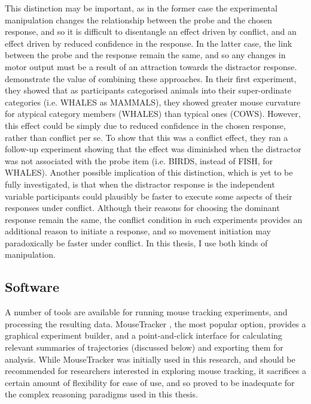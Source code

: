 This distinction may be important, as in the former case
the experimental manipulation changes the relationship between
the probe and the chosen response,
and so it is difficult to disentangle an effect driven by conflict,
and an effect driven by reduced confidence in the response.
In the latter case, the link between the probe and the response remain the same,
and so any changes in motor output
must be a result of an attraction towards the distractor response.
\citet{Dale2007} demonstrate the value of combining these approaches.
In their first experiment, they showed that
as participants categorised animals into their super-ordinate categories (i.e. WHALES as MAMMALS),
they showed greater mouse curvature for atypical category members (WHALES)
than typical ones (COWS).
However, this effect could be simply due to
reduced confidence in the chosen response, rather than conflict per se.
To show that this was a conflict effect,
they ran  a follow-up experiment showing that the effect was diminished
when the distractor was not associated with the probe item
(i.e. BIRDS, instead of FISH, for WHALES).
Another possible implication of this distinction,
which is yet to be fully investigated,
is that when the distractor response is the independent variable
participants could plausibly be faster to execute some aspects of their responses under conflict.
Although their reasons for choosing the dominant response remain the same,
the conflict condition in such experiments provides
an additional reason to initiate a response,
and so movement initiation may paradoxically be faster under conflict.
In this thesis, I use both kinds of manipulation.


\subsection{Software}\label{sec:mousetracking-software}

A number of tools are available for running mouse tracking experiments,
and processing the resulting data.
MouseTracker 
\citep[\href{http://www.mousetracker.org/}{www.MouseTracker.org};][]{Freeman2010a},
the most popular option,
provides a graphical experiment builder,
and a point-and-click interface for 
calculating relevant summaries of trajectories (discussed below)
and exporting them for analysis.
While MouseTracker was initially used in this research,
and should be recommended for researchers interested in exploring mouse tracking,
it sacrifices a certain amount of flexibility for ease of use,
and so proved to be inadequate for the complex reasoning paradigms
used in this thesis.


